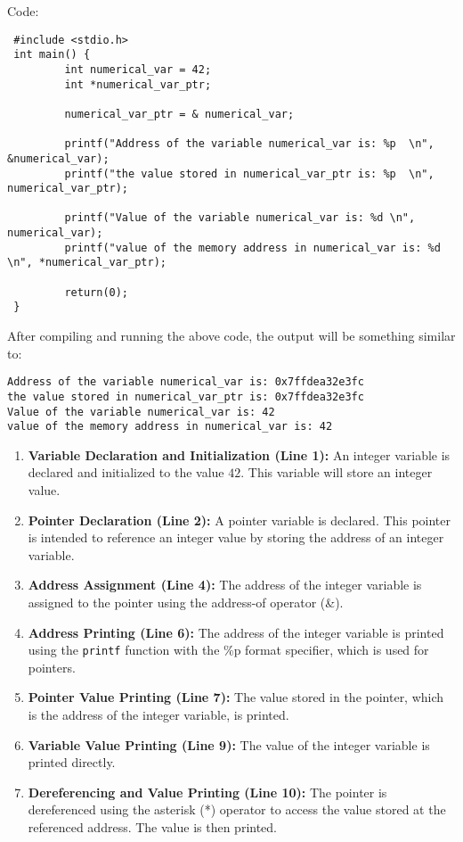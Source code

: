 Code:
\begin{lstlisting} 
 #include <stdio.h>
 int main() {
         int numerical_var = 42;
         int *numerical_var_ptr;

         numerical_var_ptr = & numerical_var;

         printf("Address of the variable numerical_var is: %p  \n", &numerical_var);
         printf("the value stored in numerical_var_ptr is: %p  \n", numerical_var_ptr);

         printf("Value of the variable numerical_var is: %d \n", numerical_var);
         printf("value of the memory address in numerical_var is: %d \n", *numerical_var_ptr);

         return(0);
 }
\end{lstlisting}

After compiling and running the above code, the output will be something similar to:
\begin{lstlisting} 
Address of the variable numerical_var is: 0x7ffdea32e3fc
the value stored in numerical_var_ptr is: 0x7ffdea32e3fc
Value of the variable numerical_var is: 42
value of the memory address in numerical_var is: 42
\end{lstlisting}




\begin{enumerate}
    \item \textbf{Variable Declaration and Initialization (Line 1):} An integer variable is declared and initialized to the value \(42\). This variable will store an integer value.

    \item \textbf{Pointer Declaration (Line 2):} A pointer variable is declared. This pointer is intended to reference an integer value by storing the address of an integer variable.

    \item \textbf{Address Assignment (Line 4):} The address of the integer variable is assigned to the pointer using the address-of operator (\&).

    \item \textbf{Address Printing (Line 6):} The address of the integer variable is printed using the \texttt{printf} function with the \%p format specifier, which is used for pointers.

    \item \textbf{Pointer Value Printing (Line 7):} The value stored in the pointer, which is the address of the integer variable, is printed.

    \item \textbf{Variable Value Printing (Line 9):} The value of the integer variable is printed directly.

    \item \textbf{Dereferencing and Value Printing (Line 10):} The pointer is dereferenced using the asterisk (*) operator to access the value stored at the referenced address. The value is then printed.
\end{enumerate}